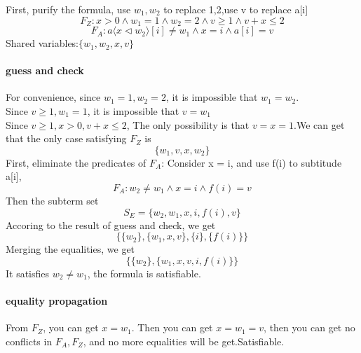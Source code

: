 \documentclass[11pt,a4paper]{article}
\newcommand{\upd}[2]{\langle #1 \triangleleft #2 \rangle}
\begin{document}
\begin{solution}
 
 First, purify the formula, use $w_1,w_2$ to replace 1,2,use v to replace a[i]
 $$F_Z:x > 0 \land w_1 = 1 \land w_2 = 2 \land v \geq 1 \land v + x \leq 2 $$
 $$F_A:a\upd{x}{w_2}[i]\not=w_1 \land x = i \land a[i] = v$$
 Shared variables:$\{w_1,w_2,x,v\}$\\
 \paragraph{guess and check}
 For convenience, since $w_1 = 1, w_2 = 2$, it is impossible that $w_1 = w_2$.\\
 Since $v \geq 1, w_1 = 1$, it is impossible that $v = w_1$\\
 Since $v \geq 1, x > 0, v + x \leq 2$, The only possibility is that $v = x = 1$.We can get that the only case satisfying $F_Z$ is $$\{{w_1,v,x},{w_2}\}$$
 First, eliminate the predicates of $F_A$:
 Consider x = i, and use f(i) to subtitude a[i],$$F_A:w_2\not=w_1 \land x = i \land f(i) = v$$
 Then the subterm set 
 $$S_E = \{w_2, w_1, x, i, f(i), v\}$$
 Accoring to the result of guess and check, we get
 $$\{\{w_2\}, \{w_1, x, v\}, \{i\}, \{f(i)\}\}$$
Merging the equalities, we get
   $$\{\{w_2\}, \{w_1, x, v, i, f(i)\} \}$$
   It satisfies $w_2 \neq w_1$, the formula is satisfiable.
 \paragraph{equality propagation}
 From $F_Z$, you can get $x = w_1$. Then you can get $x = w_1 = v$, then you can get no conflicts in $F_A,F_Z$, and no more equalities will be get.Satisfiable.
\end{solution}

\end{document}
